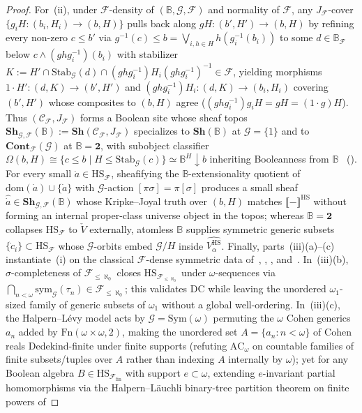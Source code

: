 \begin{proof}
For~(ii), under $\mathcal{F}$-density of $(\mathbb{B}, \mathcal{G}, \mathcal{F})$ and normality of $\mathcal{F}$, any $J_{\mathcal{F}}$-cover $\{g_i H : (b_i, H_i) \to (b, H)\}$ pulls back along $g H : (b', H') \to (b, H)$ by refining every non-zero $c \le b'$ via $g^{-1}(c) \le b = \bigvee_{i, h \in H} h(g_i^{-1}(b_i))$ to some $d \in \mathbb{B}_{\mathcal{F}}$ below $c \wedge (g h g_i^{-1})(b_i)$ with stabilizer $K := H' \cap \mathrm{Stab}_{\mathcal{G}}(d) \cap (g h g_i^{-1}) H_i (g h g_i^{-1})^{-1} \in \mathcal{F}$, yielding morphisms $1 \cdot H' : (d, K) \to (b', H')$ and $(g h g_i^{-1}) H_i : (d, K) \to (b_i, H_i)$ covering $(b', H')$ whose composites to $(b, H)$ agree ($(g h g_i^{-1}) g_i H = g H = (1 \cdot g) H$). Thus $(\mathcal{C}_{\mathcal{F}}, J_{\mathcal{F}})$ forms a Boolean site whose sheaf topos $\mathbf{Sh}_{\mathcal{G}, \mathcal{F}}(\mathbb{B}) := \mathbf{Sh}(\mathcal{C}_{\mathcal{F}}, J_{\mathcal{F}})$ specializes to $\mathbf{Sh}(\mathbb{B})$ at $\mathcal{G} = \{1\}$ and to $\mathbf{Cont}_{\mathcal{F}}(\mathcal{G})$ at $\mathbb{B} = \mathbf{2}$, with subobject classifier $\Omega(b, H) \cong \{c \le b \mid H \le \mathrm{Stab}_{\mathcal{G}}(c)\} \simeq \mathbb{B}^H{\downarrow}b$ inheriting Booleanness from $\mathbb{B}$~\cite{Fourman80} (\cite[\S D4.5]{Johnstone02}). For every small $\dot{a} \in \mathrm{HS}_{\mathcal{F}}$, sheafifying the $\mathbb{B}$-extensionality quotient of $\mathrm{dom}(\dot{a}) \cup \{\dot{a}\}$ with $\mathcal{G}$-action $[\pi\sigma] = \pi[\sigma]$ produces a small sheaf $\widehat{\dot{a}} \in \mathbf{Sh}_{\mathcal{G}, \mathcal{F}}(\mathbb{B})$ whose Kripke--Joyal truth over $(b, H)$ matches $\llbracket - \rrbracket^{\mathrm{HS}}$ without forming an internal proper-class universe object in the topos; whereas $\mathbb{B} = \mathbf{2}$ collapses $\mathrm{HS}_{\mathcal{F}}$ to $\check{V}$ externally, atomless $\mathbb{B}$ supplies symmetric generic subsets $\{\dot{c}_i\} \subset \mathrm{HS}_{\mathcal{F}}$ whose $\mathcal{G}$-orbits embed $\mathcal{G}/H$ inside $\widehat{V_\alpha^{\mathrm{HS}}}$. Finally, parts~(iii)(a)--(c) instantiate~(i) on the classical $\mathcal{F}$-dense symmetric data of~\cite[Chs.~5, 7, 10 \& \S 8.1]{Jech73}, \cite{HalpernLevy71}, \cite[Theorems~4.2--4.3]{Blass79}, and~\cite{Usuba21}. In~(iii)(b), $\sigma$-completeness of $\mathcal{F}_{\le \aleph_0}$ closes $\mathrm{HS}_{\mathcal{F}_{\le \aleph_0}}$ under $\omega$-sequences via $\bigcap_{n<\omega} \mathrm{sym}_{\mathcal{G}}(\tau_n) \in \mathcal{F}_{\le \aleph_0}$; this validates $\mathrm{DC}$ while leaving the unordered $\omega_1$-sized family of generic subsets of $\omega_1$ without a global well-ordering. In~(iii)(c), the Halpern--L\'evy model acts by $\mathcal{G} = \mathrm{Sym}(\omega)$ permuting the $\omega$ Cohen generics $a_n$ added by $\mathrm{Fn}(\omega \times \omega, 2)$, making the unordered set $A = \{a_n : n < \omega\}$ of Cohen reals Dedekind-finite under finite supports (refuting $\mathrm{AC}_\omega$ on countable families of finite subsets/tuples over $A$ rather than indexing $A$ internally by $\omega$); yet for any Boolean algebra $B \in \mathrm{HS}_{\mathcal{F}_{\mathrm{fin}}}$ with support $e \subset \omega$, extending $e$-invariant partial homomorphisms via the Halpern--L\"auchli binary-tree partition theorem on finite powers of 
\end{proof}

